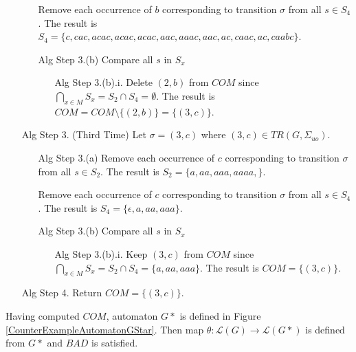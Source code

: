 \documentclass{article}
\begin{document}
\begin{enumerate}
\begin{enumerate}
			            Remove each occurrence of $b$ corresponding to transition $\sigma$ from all $s \in S_4$.
			            The result is $S_4 = \{c, cac, acac, acac, acac, aac, aaac, aac, ac, caac, ac, caabc\}$.
			        \item[Alg Step 3.(b)]
			            Compare all $s$ in $S_x$
			        \begin{enumerate}
			            \item[Alg Step 3.(b).i.]
			                Delete $(2, b)$ from $COM$ since $\bigcap_{x \in M} S_x = S_2 \cap S_4 = \emptyset$.
			                The result is $COM = COM \setminus \{(2, b)\} = \{(3,c)\}$.
			        \end{enumerate}
			    \end{enumerate}
			    \item[Alg Step 3. (Third Time)] Let $\sigma = (3, c)$ where $(3, c) \in TR(G, \Sigma_{uo})$.
			    \begin{enumerate}
			        \item[Alg Step 3.(a)]
			            Remove each occurrence of $c$ corresponding to transition $\sigma$ from all $s \in S_2$.
			            The result is $S_2 = \{a, aa, aaa, aaaa,\}$.

			            Remove each occurrence of $c$ corresponding to transition $\sigma$ from all $s \in S_4$.
			            The result is $S_4 = \{\epsilon, a, aa, aaa\}$.
			        \item[Alg Step 3.(b)]
			            Compare all $s$ in $S_x$
			        \begin{enumerate}
			            \item[Alg Step 3.(b).i.]
			                Keep $(3, c)$ from $COM$ since $\bigcap_{x \in M} S_x = S_2 \cap S_4 = \{a, aa, aaa\}$.
			                The result is $COM = \{(3,c)\}$.
			        \end{enumerate}
			    \end{enumerate}
			    \item[Alg Step 4.] Return $COM = \{(3,c)\}$.
			\end{enumerate}

			Having computed $COM$, automaton $G\ast$ is defined in Figure \ref{CounterExampleAutomatonGStar}.
			Then map $\theta : \mathcal{L}(G) \rightarrow \mathcal{L}(G\ast)$ is defined from $G\ast$ and $BAD$ is satisfied.
\end{document}
